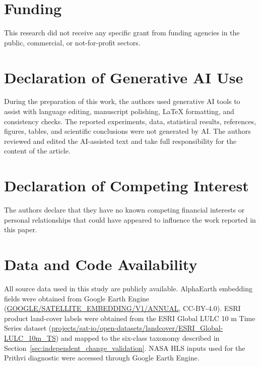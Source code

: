 \documentclass{article}
\begin{document}
\section*{Funding}
This research did not receive any specific grant from funding agencies in the public, commercial, or not-for-profit sectors.

\section*{Declaration of Generative AI Use}
During the preparation of this work, the authors used generative AI tools to assist with language editing, manuscript polishing, LaTeX formatting, and consistency checks. The reported experiments, data, statistical results, references, figures, tables, and scientific conclusions were not generated by AI. The authors reviewed and edited the AI-assisted text and take full responsibility for the content of the article.

\section*{Declaration of Competing Interest}
The authors declare that they have no known competing financial interests or personal relationships that could have appeared to influence the work reported in this paper.

\section*{Data and Code Availability}
All source data used in this study are publicly available. AlphaEarth embedding fields were obtained from Google Earth Engine (\url{GOOGLE/SATELLITE_EMBEDDING/V1/ANNUAL}, CC-BY-4.0). ESRI product land-cover labels were obtained from the ESRI Global LULC 10 m Time Series dataset (\url{projects/sat-io/open-datasets/landcover/ESRI_Global-LULC_10m_TS}) and mapped to the six-class taxonomy described in Section~\ref{sec:independent_change_validation}. NASA HLS inputs used for the Prithvi diagnostic were accessed through Google Earth Engine.
\end{document}
